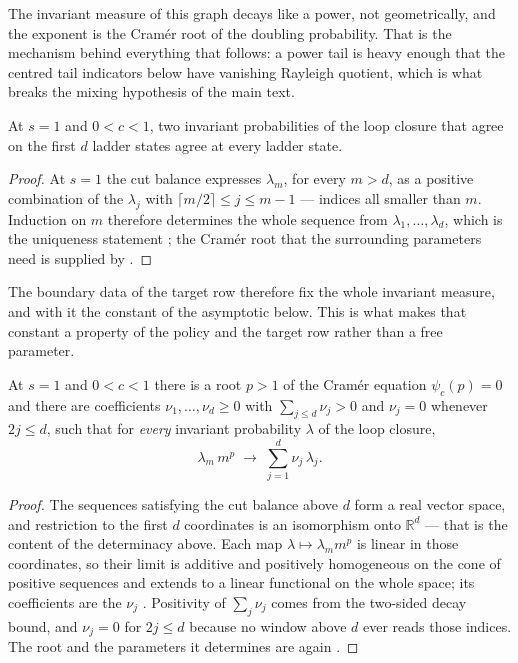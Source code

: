 \noindent The invariant measure of this graph decays like a power, not geometrically, and the exponent is
the Cram\'er root of the doubling probability. That is the mechanism behind everything that
follows: a power tail is heavy enough that the centred tail indicators below have vanishing
Rayleigh quotient, which is what breaks the mixing hypothesis of the main text.


\begin{theorem}
  \label{thm:main_constant_determined}
  \leanok
At $s=1$ and $0<c<1$, two invariant probabilities of the loop closure that agree on the first
$d$ ladder states agree at every ladder state.
\end{theorem}

\begin{proof}
  \leanok
At $s=1$ the cut balance expresses $\lambda_m$, for every $m>d$, as a positive combination of
the $\lambda_j$ with $\lceil m/2\rceil\leq j\leq m-1$ — indices all smaller than $m$. Induction
on $m$ therefore determines the whole sequence from $\lambda_1,\dots,\lambda_d$, which is the
uniqueness statement ; the Cramér root that the
surrounding parameters need is supplied by .
\end{proof}

\noindent The boundary data of the target row therefore fix the whole invariant measure, and with it the
constant of the asymptotic below. This is what makes that constant a property of the policy and
the target row rather than a free parameter.


\begin{theorem}
  \label{thm:main_constant_functional}
  \leanok
At $s=1$ and $0<c<1$ there is a root $p>1$ of the Cramér equation $\psi_c(p)=0$ and there are
coefficients $\nu_1,\dots,\nu_d\geq0$ with $\sum_{j\leq d}\nu_j>0$ and $\nu_j=0$ whenever
$2j\leq d$, such that for \emph{every} invariant probability $\lambda$ of the loop closure,
\[ \lambda_m\,m^{p}\;\longrightarrow\;\sum_{j=1}^{d}\nu_j\,\lambda_j . \]
\end{theorem}

\begin{proof}
  \leanok
The sequences satisfying the cut balance above $d$ form a real vector space, and restriction to
the first $d$ coordinates is an isomorphism onto $\mathbb R^{d}$ — that is the content of the
determinacy above. Each map $\lambda\mapsto\lambda_m m^{p}$ is linear in those coordinates, so
their limit is additive and positively homogeneous on the cone of positive sequences and
extends to a linear functional on the whole space; its coefficients are the $\nu_j$
. Positivity of $\sum_j\nu_j$ comes from the
two-sided decay bound, and $\nu_j=0$ for $2j\leq d$ because no window above $d$ ever reads
those indices. The root and the parameters it determines are again
.
\end{proof}

